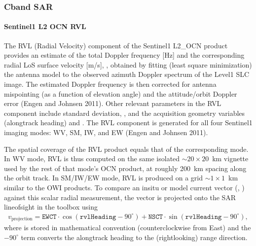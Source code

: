 \documentclass[a4paper,10pt,english]{sphinxmanual}
\begin{document}
\subsubsection{C\sphinxhyphen{}band SAR}
\label{\detokenize{05_reference_datasets:c-band-sar-2}}\label{\detokenize{05_reference_datasets:id7}}

\paragraph{Sentinel\sphinxhyphen{}1 L2 OCN \sphinxhyphen{} RVL}
\label{\detokenize{05_reference_datasets:sentinel-1-l2-ocn-rvl}}
\sphinxAtStartPar
{}

\sphinxAtStartPar
The RVL (Radial Velocity) component of the Sentinel\sphinxhyphen{}1 L2\_OCN product provides an estimate of the total Doppler frequency {[}Hz{]} and the corresponding radial LoS surface velocity {[}m/s{]}, , obtained by fitting (least square minimization) the antenna model to the observed azimuth Doppler spectrum of the Level\sphinxhyphen{}1 SLC image. The estimated Doppler frequency is then corrected for antenna mis\sphinxhyphen{}pointing (as a function of elevation angle) and the attitude/orbit Doppler error (Engen and Johnsen 2011). Other relevant parameters in the RVL component include standard deviation, , and the acquisition geometry variables  (along\sphinxhyphen{}track heading) and . The RVL component is generated for all four Sentinel\sphinxhyphen{}1 imaging modes: WV, SM, IW, and EW (Engen and Johnsen 2011).

\sphinxAtStartPar
{}

\sphinxAtStartPar
The spatial coverage of the RVL product equals that of the corresponding mode. In WV mode, RVL is thus computed on the same isolated \(\sim20\times20\) km vignette used by the rest of that mode’s OCN product, at roughly 200 km spacing along the orbit track. In SM/IW/EW mode, RVL is produced on a grid \(\sim 1 \times 1\) km similar to the OWI products. To compare an in\sphinxhyphen{}situ or model current vector (, ) against this scalar radial measurement, the vector is projected onto the SAR line\sphinxhyphen{}of\sphinxhyphen{}sight in the  toolbox using
\begin{equation*}
\begin{split}v_{\text{projection}} = \texttt{EWCT}\cdot\cos(\texttt{rvlHeading} - 90^{\circ}) + \texttt{NSCT}\cdot\sin(\texttt{rvlHeading} - 90^{\circ}),\end{split}
\end{equation*}
\sphinxAtStartPar
where  is stored in mathematical convention (counter\sphinxhyphen{}clockwise from East) and the \(-90^{\circ}\) term converts the along\sphinxhyphen{}track heading to the (right\sphinxhyphen{}looking) range direction.
\end{document}
